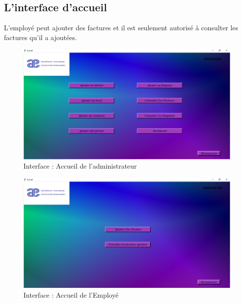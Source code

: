 \documentclass[12pt]{report}
\begin{document}
\subsection{L'interface d'accueil }
L'employé peut ajouter des factures et il est seulement autorisé à consulter les factures qu'il a ajoutées.
\begin{figure}[H]
  \centering
  \includegraphics[scale=0.47]{accueil}
  \caption{Interface : Accueil de l'administrateur}
  \label{fig:votre-label}
\end{figure}
\begin{figure}[H]
  \centering
  \includegraphics[scale=0.47]{acceuil_user}
  \caption{Interface : Accueil de l'Employé}
  \label{fig:votre-label}
\end{figure}
\end{document}
